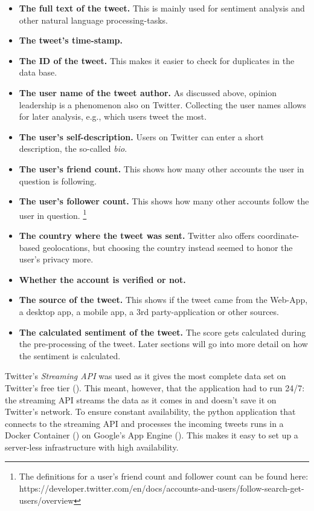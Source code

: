 \begin{itemize}
\item \textbf{The full text of the tweet.} This is mainly used for sentiment analysis and other natural language processing-tasks.
\item \textbf{The tweet's time-stamp.}
\item \textbf{The ID of the tweet.} This makes it easier to check for duplicates in the data base. 
\item \textbf{The user name of the tweet author.} As discussed above, opinion leadership is a phenomenon also on Twitter. Collecting the user names allows for later analysis, e.g., which users tweet the most.
\item \textbf{The user's self-description.} Users on Twitter can enter a short description, the so-called \emph{bio}.
\item \textbf{The user's friend count.} This shows how many other accounts the user in question is following.
\item \textbf{The user's follower count.} This shows how many other accounts follow the user in question. \footnote{The definitions for a user's friend count and follower count can be found here: https://developer.twitter.com/en/docs/accounts-and-users/follow-search-get-users/overview}
\item \textbf{The country where the tweet was sent.} Twitter also offers coordinate-based geolocations, but choosing the country instead seemed to honor the user's privacy more.
\item \textbf{Whether the account is verified or not.}
\item \textbf{The source of the tweet.} This shows if the tweet came from the Web-App, a desktop app, a mobile app, a 3rd party-application or other sources.
\item \textbf{The calculated sentiment of the tweet.} The score gets calculated during the pre-processing of the tweet. Later sections will go into more detail on how the sentiment is calculated.
\end{itemize}


Twitter's \emph{Streaming API} was used as it gives the most complete data set on Twitter's free tier (\cite{bruns2014}). This meant, however, that the application had to run 24/7: the streaming API streams the data as it comes in and doesn't save it on Twitter's network. To ensure constant availability, the python application that connects to the streaming API and processes the incoming tweets runs in a Docker Container (\cite{merkel2014docker}) on Google's App Engine (\cite{google2020}). This makes it easy to set up a server-less infrastructure with high availability.

